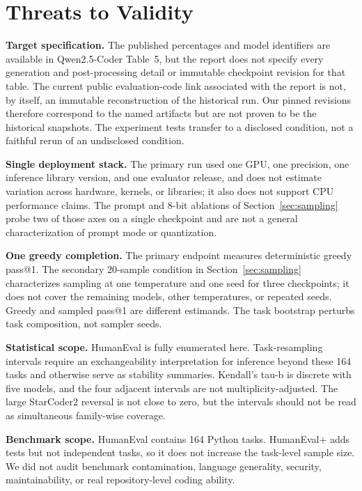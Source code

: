 \documentclass[10pt,twocolumn]{article}
\begin{document}
\section{Threats to Validity}

\textbf{Target specification.} The published percentages and model identifiers are available in Qwen2.5-Coder Table~5, but the report does not specify every generation and post-processing detail or immutable checkpoint revision for that table. The current public evaluation-code link associated with the report is not, by itself, an immutable reconstruction of the historical run. Our pinned revisions therefore correspond to the named artifacts but are not proven to be the historical snapshots. The experiment tests transfer to a disclosed condition, not a faithful rerun of an undisclosed condition.

\textbf{Single deployment stack.} The primary run used one GPU, one precision, one inference library version, and one evaluator release, and does not estimate variation across hardware, kernels, or libraries; it also does not support CPU performance claims. The prompt and 8-bit ablations of Section~\ref{sec:sampling} probe two of those axes on a single checkpoint and are not a general characterization of prompt mode or quantization.

\textbf{One greedy completion.} The primary endpoint measures deterministic greedy pass@1. The secondary 20-sample condition in Section~\ref{sec:sampling} characterizes sampling at one temperature and one seed for three checkpoints; it does not cover the remaining models, other temperatures, or repeated seeds. Greedy and sampled pass@1 are different estimands. The task bootstrap perturbs task composition, not sampler seeds.

\textbf{Statistical scope.} HumanEval is fully enumerated here. Task-resampling intervals require an exchangeability interpretation for inference beyond these 164 tasks and otherwise serve as stability summaries. Kendall's tau-b is discrete with five models, and the four adjacent intervals are not multiplicity-adjusted. The large StarCoder2 reversal is not close to zero, but the intervals should not be read as simultaneous family-wise coverage.

\textbf{Benchmark scope.} HumanEval contains 164 Python tasks. HumanEval+ adds tests but not independent tasks, so it does not increase the task-level sample size. We did not audit benchmark contamination, language generality, security, maintainability, or real repository-level coding ability.
\end{document}
